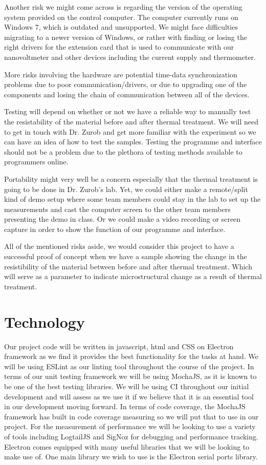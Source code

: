 \documentclass{article}
\begin{document}
Another risk we might come across is regarding the version of the operating system provided on the control computer. The computer currently runs on Windows 7, which is outdated and unsupported. We might face difficulties migrating to a newer version of Windows, or rather with finding or losing the right drivers for the extension card that is used to communicate with our nanovoltmeter and other devices including the current supply and thermometer. 

More risks involving the hardware are potential time-data synchronization problems due to poor communication/drivers, or due to upgrading one of the components and losing the chain of communication between all of the devices. 

Testing will depend on whether or not we have a reliable way to manually test the resistability of the material before and after thermal treatment. We will need to get in touch with Dr. Zurob and get more familiar with the experiment so we can have an idea of how to test the samples. Testing the programme and interface should not be a problem due to the plethora of testing methods available to programmers online. 

Portability might very well be a concern especially that the thermal treatment is going to be done in Dr. Zurob's lab. Yet, we could either make a remote/split kind of demo setup where some team members could stay in the lab to set up the measurements and cast the computer screen to the other team members presenting the demo in class. Or we could make a video recording or screen capture in order to show the function of our programme and interface. 

All of the mentioned risks aside, we would consider this project to have a successful proof of concept when we have a sample showing the change in the resistibility of the material between before and after thermal treatment. Which will serve as a parameter to indicate microstructural change as a result of thermal treatment.

\section{Technology}


Our project code will be written in javascript, html and CSS on Electron framework as 
we find it provides the best functionality for the tasks at hand. We will be using ESLint 
as our linting tool throughout the course of the project. In terms of our unit testing 
framework we will be using MochaJS, as it is known to be one of the best testing libraries. 
We will be using CI throughout our initial development and will assess as we use it if we believe
that it is an essential tool in our development moving forward. In terms of code coverage, the MochaJS 
framework has built in code coverage measuring so we will put that to use in our project. For the
measurement of performance we will be looking to use a variety of tools including LogtailJS and SigNoz 
for debugging and performance tracking. Electron comes equipped with many useful libraries that we 
will be looking to make use of. One main library we wish to use is the Electron serial ports library.
  
\end{document}
